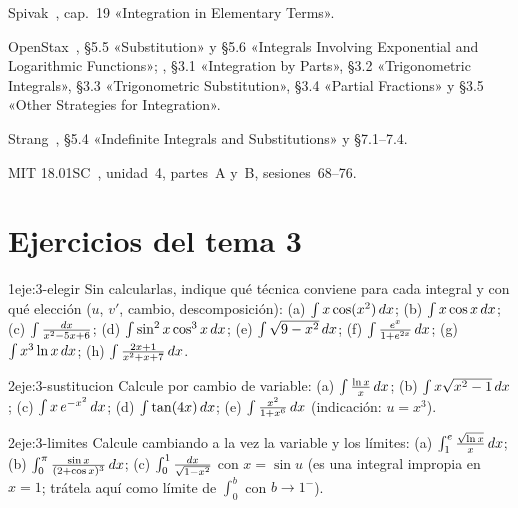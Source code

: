 \begin{lecturas}
\item Spivak~\cite{spivak}, cap.~19 «Integration in Elementary Terms».
\item OpenStax~\cite{openstax1}, §5.5 «Substitution» y §5.6 «Integrals Involving Exponential and Logarithmic Functions»; \cite{openstax2}, §3.1 «Integration by Parts», §3.2 «Trigonometric Integrals», §3.3 «Trigonometric Substitution», §3.4 «Partial Fractions» y §3.5 «Other Strategies for Integration».
\item Strang~\cite{strang}, §5.4 «Indefinite Integrals and Substitutions» y §7.1--7.4.
\item MIT 18.01SC~\cite{mit1801}, unidad~4, partes~A y~B, sesiones~68--76.
\end{lecturas}

\section*{Ejercicios del tema 3}

\begin{ejercicio}{1}{eje:3-elegir}
Sin calcularlas, indique qué técnica conviene para cada integral y con qué elección ($u$, $v'$, cambio, descomposición): (a) $\int x\cos(x^{2})\mathop{}\!d x$; (b) $\int x\cos x\mathop{}\!d x$; (c) $\int\frac{\mathop{}\!d x}{x^{2}-5x+6}$; (d) $\int\sin^{2}x\cos^{3}x\mathop{}\!d x$; (e) $\int\sqrt{9-x^{2}}\mathop{}\!d x$; (f) $\int\frac{e^{x}}{1+e^{2x}}\mathop{}\!d x$; (g) $\int x^{3}\ln x\mathop{}\!d x$; (h) $\int\frac{2x+1}{x^{2}+x+7}\mathop{}\!d x$.
\end{ejercicio}

\begin{ejercicio}{2}{eje:3-sustitucion}
Calcule por cambio de variable: (a) $\int\frac{\ln x}{x}\mathop{}\!d x$; (b) $\int x\sqrt{x^{2}-1}\mathop{}\!d x$; (c) $\int x\,e^{-x^{2}}\mathop{}\!d x$; (d) $\int\tan(4x)\mathop{}\!d x$; (e) $\int\frac{x^{2}}{1+x^{6}}\mathop{}\!d x$ (indicación: $u=x^{3}$).
\end{ejercicio}

\begin{ejercicio}{2}{eje:3-limites}
Calcule cambiando a la vez la variable y los límites: (a) $\int_1^{e}\frac{\sqrt{\ln x}}{x}\mathop{}\!d x$; (b) $\int_0^{\pi}\frac{\sin x}{(2+\cos x)^{3}}\mathop{}\!d x$; (c) $\int_0^{1}\frac{\mathop{}\!d x}{\sqrt{1-x^{2}}}$ con $x=\sin u$ (es una integral impropia en $x=1$; trátela aquí como límite de $\int_0^{b}$ con $b\to1^{-}$).
\end{ejercicio}

